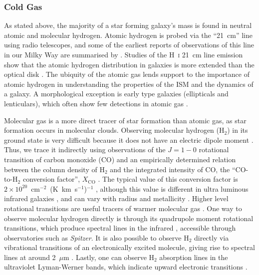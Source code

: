 \subsubsection{Cold Gas}\label{cold_gas}
As stated above, the majority of a star forming galaxy's mass is found in neutral atomic and molecular hydrogen.  Atomic hydrogen is probed via the ``21~cm'' line using radio telescopes, and some of the earliest reports of observations of this line in our Milky Way are summarised by \citet{1951AJ.....56..144V}.  Studies of the H~\textsc{i} 21~cm line emission show that the atomic hydrogen distribution in galaxies is more extended than the optical disk \citep[e.g.][]{1997A&A...324..877B,2010ASPC..438....3T}.  The ubiquity of the atomic gas lends support to the importance of atomic hydrogen in understanding the properties of the ISM and the dynamics of a galaxy.  A morphological exception is early type galaxies (ellipticals and lenticulars), which often show few detections in atomic gas \citep[e.g.][]{1985AJ.....90..454K,1987IAUS..127..145K,1995A&A...300..675H,2010MNRAS.409..500O}.

Molecular gas is a more direct tracer of star formation than atomic gas, as star formation occurs in molecular clouds.  Observing molecular hydrogen (H$_{2}$) in its ground state is very difficult because it does not have an electric dipole moment \citep{1991ARA&A..29..581Y}.  Thus, we trace it indirectly using observations of the $J=1-0$ rotational transition of carbon monoxide (CO) and an empirically determined relation between the column density of H$_{2}$ and the integrated intensity of CO, the ``CO-to-H$_{2}$ conversion factor'', $X_{\mathrm{CO}}$ \citep[e.g.][]{1991ARA&A..29..581Y}.  The typical value of this conversion factor is $2 \times 10^{20}$~cm$^{-2}$~(K~km~s$^{-1}$)$^{-1}$ \citep{1988A&A...207....1S}, although this value is different in ultra luminous infrared galaxies \citep{1998ApJ...507..615D}, and can vary with radius and metallicity \citep[e.g. ][ and references therein]{2013arXiv1301.3498B}.  Higher level rotational transitions are useful tracers of warmer molecular gas \citep{2009ApJ...693.1736W}.  One way to observe molecular hydrogen directly is through its quadrupole moment rotational transitions, which produce spectral lines in the infrared \citep{1991ARA&A..29..581Y}, accessible through observatories such as \emph{Spitzer}.  It is also possible to observe H$_{2}$ directly via vibrational transitions of an electronically excited molecule, giving rise to spectral lines at around 2~$\mu$m \citep{2005pcim.book.....T}.  Lastly, one can observe H$_{2}$ absorption lines in the ultraviolet Lyman-Werner bands, which indicate upward electronic transitions \citep{2005pcim.book.....T}.


